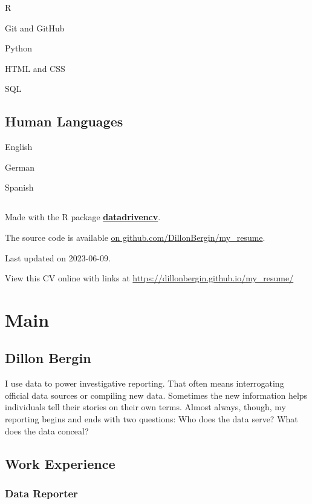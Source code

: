 \documentclass[
]{article}
\begin{document}
R

Git and GitHub

Python

HTML and CSS

SQL

\hypertarget{skills2}{%
\subsection{Human Languages}\label{skills2}}

English

German

Spanish

\hypertarget{nothing}{%
\subsection{}\label{nothing}}

Made with the R package
\href{https://github.com/nstrayer/datadrivencv}{\textbf{datadrivencv}}.

The source code is available
\href{https://github.com/DillonBergin/my_resume}{on
github.com/DillonBergin/my\_resume}.

Last updated on 2023-06-09.

View this CV online with links at
\url{https://dillonbergin.github.io/my_resume/}

\hypertarget{main}{%
\section{Main}\label{main}}

\hypertarget{title}{%
\subsection{Dillon Bergin}\label{title}}

I use data to power investigative reporting. That often means
interrogating official data sources or compiling new data. Sometimes the
new information helps individuals tell their stories on their own terms.
Almost always, though, my reporting begins and ends with two questions:
Who does the data serve? What does the data conceal?

\hypertarget{work-experience}{%
\subsection{Work Experience}\label{work-experience}}

\hypertarget{data-reporter}{%
\subsubsection{Data Reporter}\label{data-reporter}}
\end{document}
